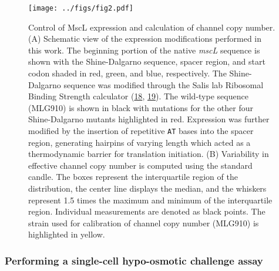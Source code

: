 \begin{figure}
\centering
\texttt{[image: ../figs/fig2.pdf]}
\caption{Control
of
MscL
expression
and
calculation
of
channel
copy
number.
(A)
Schematic
view
of the
expression
modifications
performed
in
this
work.
The
beginning
portion
of the
native
\emph{mscL}
sequence
is
shown
with
the
Shine-Dalgarno
sequence,
spacer
region,
and
start
codon
shaded
in
red,
green,
and
blue,
respectively.
The
Shine-Dalgarno
sequence
was
modified
through
the
Salis
lab
Ribosomal
Binding
Strength
calculator
(\protect\hyperlink{ref-espahborujeni2014}{18},
\protect\hyperlink{ref-salis2009}{19}).
The
wild-type
sequence
(MLG910)
is
shown
in
black
with
mutations
for
the
other
four
Shine-Dalgarno
mutants
highlighted
in
red.
Expression
was
further
modified
by the
insertion
of
repetitive
\texttt{AT}
bases
into
the
spacer
region,
generating
hairpins
of
varying
length
which
acted
as a
thermodynamic
barrier
for
translation
initiation.
(B)
Variability
in
effective
channel
copy
number
is
computed
using
the
standard
candle.
The
boxes
represent
the
interquartile
region
of the
distribution,
the
center
line
displays
the
median,
and
the
whiskers
represent
1.5
times
the
maximum
and
minimum
of the
interquartile
region.
Individual
measurements
are
denoted
as
black
points.
The
strain
used
for
calibration
of
channel
copy
number
(MLG910)
is
highlighted
in
yellow.}\label{fig:boxplot}
\end{figure}

\subsubsection{Performing
a
single-cell
hypo-osmotic
challenge
assay}\label{performing-a-single-cell-hypo-osmotic-challenge-assay}

